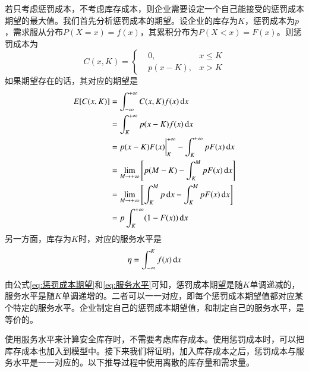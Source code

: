若只考虑惩罚成本，不考虑库存成本，则企业需要设定一个自己能接受的惩罚成本期望的最大值。我们首先分析惩罚成本的期望。设企业的库存为$K$，惩罚成本为$p$，需求服从分布$P(X=x)=f(x)$，其累积分布为$P(X<x)=F(x)$。则惩罚成本为
\begin{equation}
C(x,K)=\left\{
\begin{aligned}
&0, &x \leq K \\
&p(x-K), &x > K
\end{aligned}
\right.
\label{eq:惩罚成本}
\end{equation}
如果期望存在的话，其对应的期望是
\begin{align}
E[C(x,K)] &= \int_{-\infty}^{+\infty}C(x,K)f(x)\operatorname{d\!} x\notag\\
&=\int_K^{+\infty}p(x-K)f(x)\operatorname{d\!} x\notag\\
&=p(x-K)F(x)\bigg|_K^{+\infty} - \int_K^{+\infty}pF(x)\operatorname{d\!} x\notag\\
&=\lim_{M\to+\infty}\left[p(M-K) - \int_K^MpF(x)\operatorname{d\!} x\right]\notag\\
&=\lim_{M\to+\infty}\left[\int_K^Mp\operatorname{d\!} x - \int_K^MpF(x)\operatorname{d\!} x\right]\notag\\
&=p\int_K^{+\infty}(1-F(x))\operatorname{d\!} x
\label{eq:惩罚成本期望}
\end{align}
另一方面，库存为$K$时，对应的服务水平是
\begin{equation}
\eta = \int_{-\infty}^Kf(x)\operatorname{d\!} x
\label{eq:服务水平}
\end{equation}

由公式\ref{eq:惩罚成本期望}和\ref{eq:服务水平}可知，惩罚成本期望是随$K$单调递减的，服务水平是随$K$单调递增的。二者可以一一对应，即每个惩罚成本期望值都对应某个特定的服务水平。企业制定自己的惩罚成本期望值，和制定自己的服务水平，是等价的。

使用服务水平来计算安全库存时，不需要考虑库存成本。使用惩罚成本时，可以把库存成本也加入到模型中。接下来我们将证明，加入库存成本之后，惩罚成本与服务水平是一一对应的。以下推导过程中使用离散的库存量和需求量。

